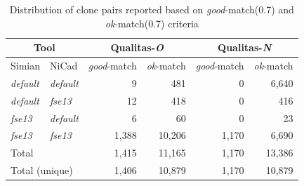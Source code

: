 \documentclass{IEEEtran}
\begin{document}

\begin{table}[H]
	\centering
	\caption{Distribution of clone pairs reported based on \textit{good}-match(0.7) and \textit{ok}-match(0.7) criteria}
	\label{t_agreed_good_clone_pairs}
	\begin{tabular}{l|l|r|r|r|r}
		\hline
		\multicolumn{2}{c|}{Tool} & \multicolumn{2}{c|}{Qualitas-\textit{O}} & \multicolumn{2}{c}{Qualitas-\textit{N}} \\
		\hline
		Simian & NiCad & \textit{good}-match & \textit{ok}-match & \textit{good}-match & \textit{ok}-match \\
		\hline
		\textit{default} & \textit{default} & 9 	& 481 	& 0 & 6,640 \\ 
		\textit{default} & \textit{fse13} 	& 12 	& 418 	& 0 & 416 \\ 
		\textit{fse13} 	& \textit{default} 	& 6 	& 60 	& 0 & 23 \\
		\textit{fse13} 	& \textit{fse13} 	& 1,388 & 10,206 & 1,170 & 6,690 \\ 
		\hline
		\multicolumn{2}{l|}{Total} & 1,415 & 11,165 & 1,170 & 13,386 \\
		\multicolumn{2}{l|}{Total (unique)} & 1,406 & 10,879 & 1,170 & 10,879 \\
		\hline
	\end{tabular}
\end{table}
\end{document}
